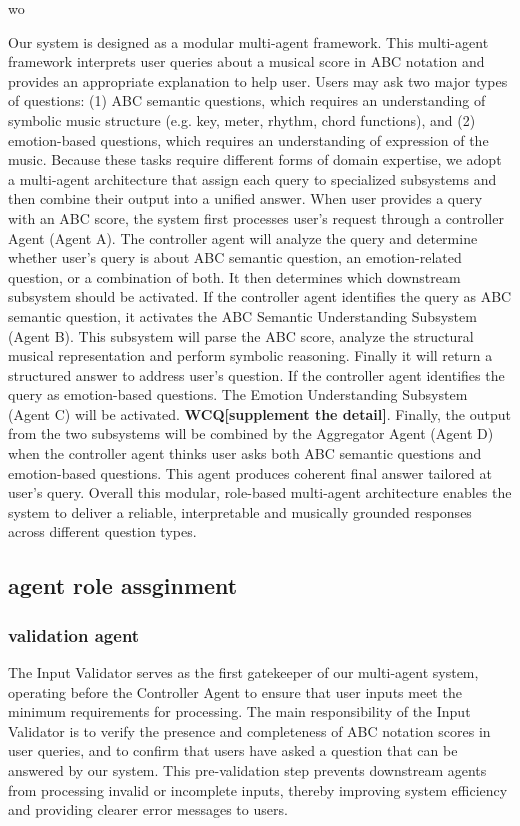 wo\documentclass[sigconf]{acmart}
\begin{document}
Our system is designed as a modular multi-agent framework. This multi-agent framework interprets user queries about a musical score in ABC notation and provides an appropriate explanation to help user. Users may ask two major types of questions: (1) ABC semantic questions, which requires an understanding of symbolic music structure (e.g. key, meter, rhythm, chord functions), and (2) emotion-based questions, which requires an understanding of expression of the music. Because these tasks require different forms of domain expertise, we adopt a multi-agent architecture that assign each query to specialized subsystems and then combine their output into a unified answer.  When user provides a query with an ABC score, the system first processes user’s request through a controller Agent (Agent A). The controller agent will analyze the query and determine whether user’s query is about ABC semantic question, an emotion-related question, or a combination of both. It then determines which downstream subsystem should be activated. If the controller agent identifies the query as ABC semantic question, it activates the ABC Semantic Understanding Subsystem (Agent B). This subsystem will parse the ABC score, analyze the structural musical representation and perform symbolic reasoning. Finally it will return a structured answer to address user’s question. If the controller agent identifies the query as emotion-based questions. The Emotion Understanding Subsystem (Agent C) will be activated. \textbf{WCQ[supplement the detail]}. Finally, the output from the two subsystems will be combined by the Aggregator Agent (Agent D) when the controller agent thinks user asks both ABC semantic questions and emotion-based questions. This agent produces coherent final answer tailored at user’s query. Overall this modular, role-based multi-agent architecture enables the system to deliver a reliable, interpretable and musically grounded responses across different question types. 
\subsection{agent role assginment}
\subsubsection{validation agent}
The Input Validator serves as the first gatekeeper of our multi-agent system, operating before the Controller Agent to ensure that user inputs meet the minimum requirements for processing. The main responsibility of the Input Validator is to verify the presence and completeness of ABC notation scores in user queries, and to confirm that users have asked a question that can be answered by our system. This pre-validation step prevents downstream agents from processing invalid or incomplete inputs, thereby improving system efficiency and providing clearer error messages to users.
\end{document}
